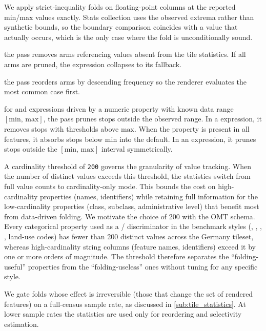 \begin{description}
    We apply strict-inequality folds on floating-point columns at the reported min/max values exactly.
Stats collection uses the observed extrema rather than synthetic bounds, so the boundary comparison coincides with a value that actually occurs, which is the only case where the fold is unconditionally sound.
    \item[Match/in arm pruning] the pass removes arms referencing values absent from the tile statistics.
If all arms are pruned, the expression collapses to its fallback.
    \item[Match arm reordering] the pass reorders arms by descending frequency so the renderer evaluates the most common case first.
    \item[Data-ramp pruning] for  and  expressions driven by a numeric property with known data range $[\mathrm{min},\, \mathrm{max}]$, the pass prunes stops outside the observed range.
    In a  expression, it removes stops with thresholds above $\mathrm{max}$.
When the property is present in all features, it absorbs stops below $\mathrm{min}$ into the default.
    In an  expression, it prunes stops outside the $[\mathrm{min},\, \mathrm{max}]$ interval symmetrically.
\end{description}

\noindent A cardinality threshold of \texttt{200} governs the granularity of value tracking.
When the number of distinct values exceeds this threshold, the statistics switch from full value counts to cardinality-only mode.
This bounds the cost on high-cardinality properties (names, identifiers) while retaining full information for the low-cardinality properties (class, subclass, administrative level) that benefit most from data-driven folding.
We motivate the choice of 200 with the \ac{OMT} schema.
Every categorical property used as a /  discriminator in the benchmark styles (, , , , land-use codes) has fewer than 200 distinct values across the Germany tileset, whereas high-cardinality string columns (feature names, identifiers) exceed it by one or more orders of magnitude.
The threshold therefore separates the \enquote{folding-useful} properties from the \enquote{folding-useless} ones without tuning for any specific style.

We gate folds whose effect is irreversible (those that change the set of rendered features) on a full-census sample rate, as discussed in \cref{sub:tile_statistics}.
At lower sample rates the statistics are used only for reordering and selectivity estimation.


